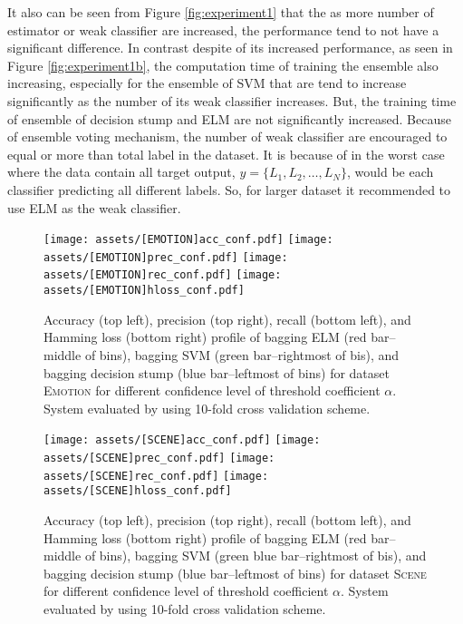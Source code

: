 \documentclass{article}
\begin{document}
It also can be seen from Figure \ref{fig:experiment1} that the as more number of estimator or weak classifier are increased, the performance tend to not have a significant difference. In contrast despite of its increased performance, as seen in Figure \ref{fig:experiment1b}, the computation time of training the ensemble also increasing, especially for the ensemble of SVM that are tend to increase significantly as the number of its weak classifier increases. But, the training time of ensemble of decision stump and ELM are not significantly increased. Because of ensemble voting mechanism, the number of weak classifier are encouraged to equal or more than total label in the dataset. It is because of in the worst case where the data contain all target output, $y = \{L_1,L_2,\dots,L_N\}$, would be each classifier predicting all different labels. So, for larger dataset it recommended to use ELM as the weak classifier.


\begin{figure*}[htpb!]
\vskip 0.2in
	\begin{subfigure}{}
	\centering
		\texttt{[image: assets/[EMOTION]acc\_conf.pdf]}
		\texttt{[image: assets/[EMOTION]prec\_conf.pdf]}
		\texttt{[image: assets/[EMOTION]rec\_conf.pdf]}
		\texttt{[image: assets/[EMOTION]hloss\_conf.pdf]}
		\caption{Accuracy (top left), precision (top right), recall (bottom left), and Hamming loss (bottom right) profile of bagging ELM (red bar--middle of bins), bagging SVM (green bar--rightmost of bis), and bagging decision stump (blue bar--leftmost of bins) for dataset \textsc{Emotion} for different confidence level of threshold coefficient $\alpha$. System evaluated by using 10-fold cross validation scheme.}
		\label{fig:experiment2}
	\end{subfigure}
\vskip -0.2in
\end{figure*}

\begin{figure*}[htpb!]
\vskip 0.2in
	\begin{subfigure}{}
	\centering
		\texttt{[image: assets/[SCENE]acc\_conf.pdf]}
		\texttt{[image: assets/[SCENE]prec\_conf.pdf]}
		\texttt{[image: assets/[SCENE]rec\_conf.pdf]}
		\texttt{[image: assets/[SCENE]hloss\_conf.pdf]}
		\caption{Accuracy (top left), precision (top right), recall (bottom left), and Hamming loss (bottom right) profile of bagging ELM (red bar--middle of bins), bagging SVM (green blue bar--rightmost of bis), and bagging decision stump (blue bar--leftmost of bins) for dataset \textsc{Scene} for different confidence level of threshold coefficient $\alpha$. System evaluated by using 10-fold cross validation scheme.}
		\label{fig:experiment2b}
	\end{subfigure}
\vskip -0.2in
\end{figure*} 
\end{document}

